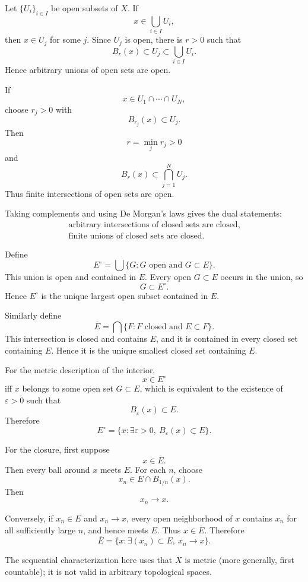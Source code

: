 \begin{solution}
Let \(\{U_i\}_{i\in I}\) be open subsets of \(X\). If
\[
x\in\bigcup_{i\in I}U_i,
\]
then \(x\in U_j\) for some \(j\). Since \(U_j\) is open, there is \(r>0\) such that
\[
B_r(x)\subset U_j\subset\bigcup_{i\in I}U_i.
\]
Hence arbitrary unions of open sets are open.

If
\[
x\in U_1\cap\cdots\cap U_N,
\]
choose \(r_j>0\) with
\[
B_{r_j}(x)\subset U_j.
\]
Then
\[
r=\min_jr_j>0
\]
and
\[
B_r(x)\subset\bigcap_{j=1}^{N}U_j.
\]
Thus finite intersections of open sets are open.

Taking complements and using De Morgan's laws gives the dual statements:
\[
\boxed{
\begin{array}{l}
\text{arbitrary intersections of closed sets are closed},\\
\text{finite unions of closed sets are closed}.
\end{array}}
\]

Define
\[
E^\circ
=
\bigcup\{G:G\text{ open and }G\subset E\}.
\]
This union is open and contained in \(E\). Every open \(G\subset E\) occurs in the union, so
\[
G\subset E^\circ.
\]
Hence \(E^\circ\) is the unique largest open subset contained in \(E\).

Similarly define
\[
\overline E
=
\bigcap\{F:F\text{ closed and }E\subset F\}.
\]
This intersection is closed and contains \(E\), and it is contained in every closed set
containing \(E\). Hence it is the unique smallest closed set containing \(E\).

For the metric description of the interior,
\[
x\in E^\circ
\]
iff \(x\) belongs to some open set \(G\subset E\), which is equivalent to the existence of
\(\varepsilon>0\) such that
\[
B_\varepsilon(x)\subset E.
\]
Therefore
\[
\boxed{
E^\circ
=
\{x:\exists\varepsilon>0,\ B_\varepsilon(x)\subset E\}.
}
\]

For the closure, first suppose
\[
x\in\overline E.
\]
Then every ball around \(x\) meets \(E\). For each \(n\), choose
\[
x_n\in E\cap B_{1/n}(x).
\]
Then
\[
x_n\to x.
\]

Conversely, if \(x_n\in E\) and \(x_n\to x\), every open neighborhood of \(x\) contains
\(x_n\) for all sufficiently large \(n\), and hence meets \(E\). Thus \(x\in\overline E\).
Therefore
\[
\boxed{
\overline E
=
\{x:\exists(x_n)\subset E,\ x_n\to x\}.
}
\]

The sequential characterization here uses that \(X\) is metric (more generally, first
countable); it is not valid in arbitrary topological spaces.
\end{solution}


